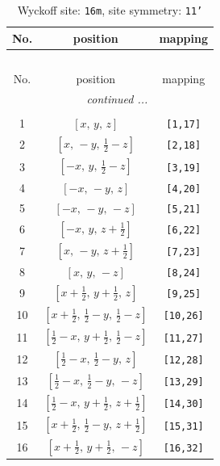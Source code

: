 \documentclass[fleqn,8pt]{jsarticle}
\begin{document}
\begin{longtable}{ccc}
\caption{Wyckoff site: {\tt 16m}, site symmetry: {\tt 11'}}
 \\
 \hline \hline
No. & position & mapping \\ \hline \endfirsthead

\multicolumn{2}{l}{\tablename\ \thetable{}} \\
 \hline \hline
No. & position & mapping \\ \hline \endhead

 \hline \hline
\multicolumn{2}{r}{\footnotesize\it continued ...} \\ \endfoot

 \hline \hline
\multicolumn{2}{r}{} \\ \endlastfoot

1 & $\left[ x,\, y,\, z \right]$ & {\tt [1,17]} \\ \hline
2 & $\left[ x,\, - y,\, \frac{1}{2} - z \right]$ & {\tt [2,18]} \\ \hline
3 & $\left[ - x,\, y,\, \frac{1}{2} - z \right]$ & {\tt [3,19]} \\ \hline
4 & $\left[ - x,\, - y,\, z \right]$ & {\tt [4,20]} \\ \hline
5 & $\left[ - x,\, - y,\, - z \right]$ & {\tt [5,21]} \\ \hline
6 & $\left[ - x,\, y,\, z + \frac{1}{2} \right]$ & {\tt [6,22]} \\ \hline
7 & $\left[ x,\, - y,\, z + \frac{1}{2} \right]$ & {\tt [7,23]} \\ \hline
8 & $\left[ x,\, y,\, - z \right]$ & {\tt [8,24]} \\ \hline
9 & $\left[ x + \frac{1}{2},\, y + \frac{1}{2},\, z \right]$ & {\tt [9,25]} \\ \hline
10 & $\left[ x + \frac{1}{2},\, \frac{1}{2} - y,\, \frac{1}{2} - z \right]$ & {\tt [10,26]} \\ \hline
11 & $\left[ \frac{1}{2} - x,\, y + \frac{1}{2},\, \frac{1}{2} - z \right]$ & {\tt [11,27]} \\ \hline
12 & $\left[ \frac{1}{2} - x,\, \frac{1}{2} - y,\, z \right]$ & {\tt [12,28]} \\ \hline
13 & $\left[ \frac{1}{2} - x,\, \frac{1}{2} - y,\, - z \right]$ & {\tt [13,29]} \\ \hline
14 & $\left[ \frac{1}{2} - x,\, y + \frac{1}{2},\, z + \frac{1}{2} \right]$ & {\tt [14,30]} \\ \hline
15 & $\left[ x + \frac{1}{2},\, \frac{1}{2} - y,\, z + \frac{1}{2} \right]$ & {\tt [15,31]} \\ \hline
16 & $\left[ x + \frac{1}{2},\, y + \frac{1}{2},\, - z \right]$ & {\tt [16,32]} \\
\end{longtable}
\end{document}
